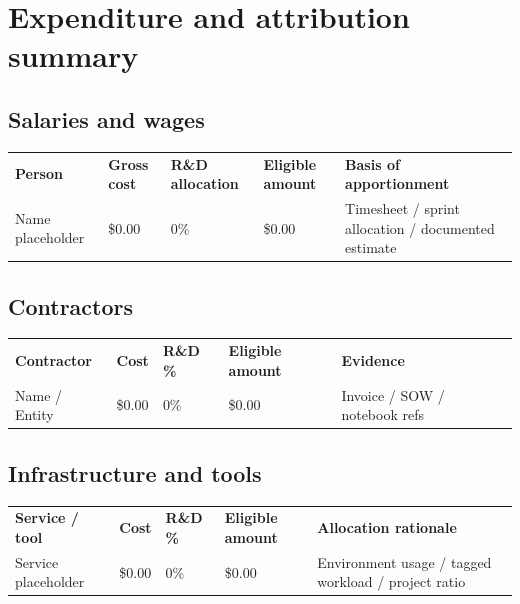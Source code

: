 \documentclass[11pt]{article}
\begin{document}

\section{Expenditure and attribution summary}
\subsection{Salaries and wages}
\begin{xltabular}{\textwidth}{L{3.2cm}L{2.4cm}L{2.1cm}L{2.6cm}Y}
\textbf{Person} & \textbf{Gross cost} & \textbf{R\&D allocation} & \textbf{Eligible amount} & \textbf{Basis of apportionment} \\
{Name placeholder} & {\$0.00} & {0\%} & {\$0.00} & {Timesheet / sprint allocation / documented estimate} \\
\end{xltabular}

\subsection{Contractors}
\begin{xltabular}{\textwidth}{L{3.8cm}L{2.0cm}L{2.0cm}L{2.4cm}Y}
\textbf{Contractor} & \textbf{Cost} & \textbf{R\&D \%} & \textbf{Eligible amount} & \textbf{Evidence} \\
{Name / Entity} & {\$0.00} & {0\%} & {\$0.00} & {Invoice / SOW / notebook refs} \\
\end{xltabular}

\subsection{Infrastructure and tools}
\begin{xltabular}{\textwidth}{L{3.8cm}L{2.0cm}L{2.0cm}L{2.4cm}Y}
\textbf{Service / tool} & \textbf{Cost} & \textbf{R\&D \%} & \textbf{Eligible amount} & \textbf{Allocation rationale} \\
{Service placeholder} & {\$0.00} & {0\%} & {\$0.00} & {Environment usage / tagged workload / project ratio} \\
\end{xltabular}
\end{document}
